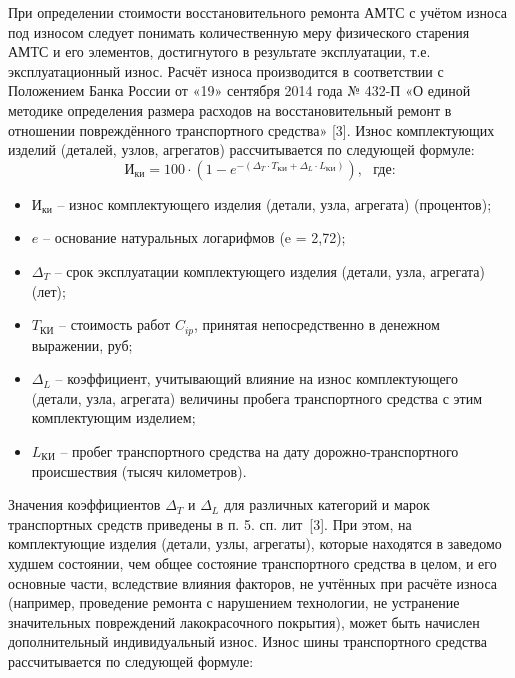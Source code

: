 \par При определении стоимости восстановительного ремонта АМТС с учётом износа под износом следует понимать количественную меру физического старения АМТС и его элементов, достигнутого в результате эксплуатации, т.е. эксплуатационный износ.
%
Расчёт износа производится в  соответствии с Положением Банка России от «19» сентября 2014 года № 432-П «О единой методике определения размера расходов на восстановительный ремонт в отношении повреждённого транспортного средства» [3].
Износ комплектующих изделий (деталей, узлов, агрегатов) рассчитывается по следующей формуле:
%
\begin{equation}\label{eq:I}
\text{И}_{\text{ки}} 
= 100\cdot\left( 1-e^ {-\left( \Delta_{T} \cdot T_{\text{КИ}} + \Delta_{L} \cdot L_{\text{КИ}} \right)}\right), \,\,\,\,\text{где:}   
\end{equation}
%
\begin{itemize}
	\item[ ]$ \text{И}_{\text{ки}} $ -- износ комплектующего изделия (детали, узла, агрегата) (процентов); 
	\item[ ]$ e $ -- основание натуральных логарифмов (e =  2,72);
	\item[ ]$ \Delta_{T}$ --  срок эксплуатации комплектующего изделия (детали, узла, агрегата) (лет);
	\item[ ]$ T_{\text{КИ}} $ -- стоимость работ $ C_{ip} $, принятая непосредственно в денежном выражении, руб;
	\item[ ]$ \Delta_{L} $ -- коэффициент, учитывающий влияние на износ комплектующего (детали, узла, агрегата) величины пробега транспортного средства с этим комплектующим изделием;
	\item[ ]$ L_{\text{КИ}} $ -- пробег транспортного средства на дату дорожно-транспортного происшествия (тысяч километров).  
\end{itemize}
\vspace{5mm}
\par Значения коэффициентов $ \Delta_{T}$  и $ \Delta_{L} $  для различных категорий и марок транспортных средств приведены в п. 5. сп. лит~[3]. При этом, на комплектующие изделия (детали, узлы, агрегаты), которые находятся в заведомо худшем состоянии, чем общее состояние транспортного средства в целом, и его основные части, вследствие влияния факторов, не учтённых при расчёте износа (например, проведение ремонта с нарушением технологии, не устранение значительных повреждений лакокрасочного покрытия), может быть начислен дополнительный индивидуальный износ. 
Износ шины транспортного средства рассчитывается по следующей формуле:
